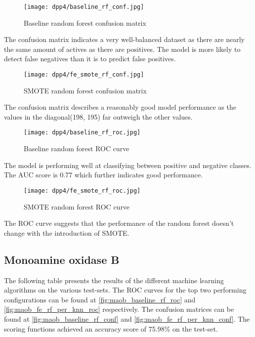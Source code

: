 \begin{figure}[H]
    \begin{center}
        \caption[]{Baseline random forest confusion matrix}
        \label{fig:dpp4_baseline_rf_conf}
        \texttt{[image: dpp4/baseline\_rf\_conf.jpg]}
    \end{center}
\end{figure}
The confusion matrix indicates a very well-balanced dataset as there are nearly the same amount of actives as there are positives. The model is more likely to detect false negatives than it is to predict false positives.
\begin{figure}[H]
    \begin{center}
        \caption[]{SMOTE random forest confusion matrix}
        \label{fig:dpp4_smote_rf_conf}
        \texttt{[image: dpp4/fe\_smote\_rf\_conf.jpg]}
    \end{center}

\end{figure}
The confusion matrix describes a reasonably good model performance as the values in the diagonal(198, 195) far outweigh the other values.

\begin{figure}[H]
    \begin{center}
        \caption[]{Baseline random forest ROC curve}
        \label{fig:dpp4_baseline_rf_roc}
        \texttt{[image: dpp4/baseline\_rf\_roc.jpg]}
    \end{center}
\end{figure}
The model is performing well at classifying between positive and negative classes. The AUC score is 0.77 which further indicates good performance.

\begin{figure}[H]
    \begin{center}
        \caption[]{SMOTE random forest ROC curve}
        \label{fig:dpp4_smote_rf_roc}
        \texttt{[image: dpp4/fe\_smote\_rf\_roc.jpg]}
    \end{center}
\end{figure}
The ROC curve suggests that the performance of the random forest doesn't change with the introduction of SMOTE.

\subsection{Monoamine oxidase B}
The following table presents the results of the different machine learning algorithms on the various
test-sets. The ROC curves for the top two performing configurations can be found at \ref{fig:maob_baseline_rf_roc} and \ref{fig:maob_fe_rf_per_knn_roc}
respectively. The confusion matrices can be found at \ref{fig:maob_baseline_rf_conf} and \ref{fig:maob_fe_rf_per_knn_conf}.
The scoring functions achieved an accuracy score of 75.98\% on the test-set.

